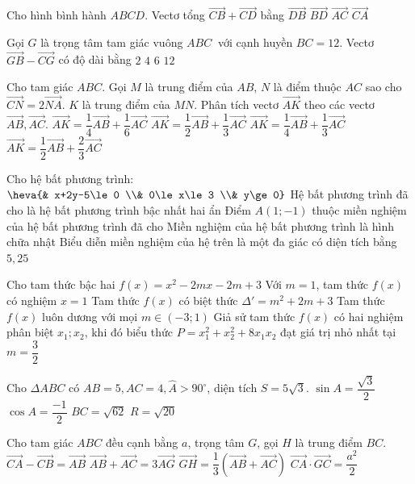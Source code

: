 \begin{ex}
 Cho hình bình hành $ABCD$. Vectơ tổng $\vec{CB}+\vec{CD}$ bằng
\choice
{$\vec{DB}$}
{$\vec{BD}$}
{$\vec{AC}$}
{$\vec{CA}$}
\loigiai{ }
\end{ex}\newpage
\begin{ex}
 Gọi $G$ là trọng tâm tam giác vuông $ABC~$ với cạnh huyền $BC = 12$. Vectơ $\vec{GB}-\vec{CG}$ có độ dài bằng
\choice
{$2$}
{$4$}
{$6$}
{$12$}
\loigiai{ }
\end{ex}
\begin{ex}
 Cho tam giác $ABC$. Gọi $M$ là trung điểm của $AB$, $N$ là điểm thuộc $AC$ sao cho $\vec{CN}=2\vec{NA}$. $K$ là trung điểm của $MN$. Phân tích vectơ $\vec{AK}$ theo các vectơ $\vec{AB},\vec{AC}$.
\choice
{$\vec{AK}=\dfrac{1}{4}\vec{AB}+\dfrac{1}{6}\vec{AC}$}
{$\vec{AK}=\dfrac{1}{2}\vec{AB}+\dfrac{1}{3}\vec{AC}$}
{$\vec{AK}=\dfrac{1}{4}\vec{AB}+\dfrac{1}{3}\vec{AC}$}
{$\vec{AK}=\dfrac{1}{2}\vec{AB}+\dfrac{2}{3}\vec{AC}$}
\loigiai{ }
\end{ex}\newpage
\TNTF
\begin{ex}
Cho hệ bất phương trình: $\heva{& x+2y-5\le 0 \\& 0\le x\le 3 \\& y\ge 0}$
\choiceTF
{Hệ bất phương trình đã cho là hệ bất phương trình bậc nhất hai ẩn}
{Điểm $A(1;-1)$ thuộc miền nghiệm của hệ bất phương trình đã cho}
{Miền nghiệm của hệ bất phương trình là hình chữa nhật}
{Biểu diễn miền nghiệm của hệ trên là một đa giác có diện tích bằng $5{,}25$}
\loigiai{ }
\end{ex}\newpage
\begin{ex}
Cho tam thức bậc hai $f(x)=x^2-2mx-2m+3$
\choiceTF
{Với $m=1$, tam thức $f(x)$ có nghiệm $x=1$}
{Tam thức $f(x)$ có biệt thức $\Delta'=m^2+2m+3$}
{Tam thức $f(x)$ luôn dương với mọi $m\in (-3;1)$}
{Giả sử tam thức $f(x)$ có hai nghiệm phân biệt $x_1;x_2$, khi đó biểu thức $P=x_1^2+x_2^2+8x_1x_2$ đạt giá trị nhỏ nhất tại $m=\dfrac{3}{2}$}
\loigiai{ }
\end{ex}\newpage
\begin{ex}
Cho $\Delta A B C$ có $AB=5,AC=4,\widehat{A}>90^\circ$, diện tích $S=5\sqrt{3}$.
\choiceTF
{$\sin A=\dfrac{\sqrt{3}}{2}$}
{$\cos A=\dfrac{-1}{2}$}
{$BC=\sqrt{62}$}
{$R=\sqrt{20}$}
\loigiai{ }
\end{ex}\newpage
\begin{ex}
Cho tam giác $ABC$ đều cạnh bằng $a$, trọng tâm $G$, gọi $H$ là trung điểm $BC$.
\choiceTF
{$\vec{CA}-\vec{CB}=\vec{AB}$}
{$\vec{AB}+\vec{AC}=3\vec{AG}$}
{$\vec{GH}=\dfrac{1}{3}(\vec{AB}+\vec{AC})$}
{$\vec{CA} \cdot \vec{GC}=\dfrac{a^2}{2}$}
\loigiai{ }
\end{ex}\newpage

